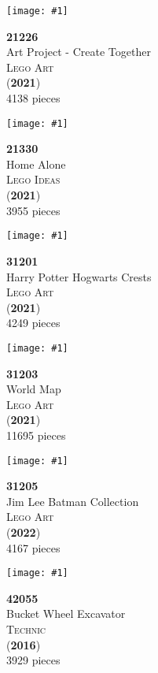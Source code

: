 \documentclass[letterpaper]{article}%
\newenvironment{legocell}[1]
{
	\begin{minipage}[c][2.0in][c]{4in}
	\centering
	\varwidth{3.6in}
	\raggedright %
	\begin{minipage}[c]{1.3in}
		\texttt{[image: \#1]}
	\end{minipage}
	\begin{minipage}[c]{2.2in}
	\raggedright
}
{
	\end{minipage}
	\endvarwidth
	\end{minipage}
	\allowbreak
	\ignorespaces
}
\begin{document}
\begin{legocell}{images/set_21226-1.jpg}
\textbf{21226}\\
{\sffamily\large Art Project - Create Together}\\
\textsc{\color{DarkBlue}\normalsize Lego Art}\\
(\textbf{2021})\\
{\normalsize 4138 pieces}\\
\end{legocell}
\begin{legocell}{images/set_21330-1.jpg}
\textbf{21330}\\
{\sffamily\large Home Alone}\\
\textsc{\color{DarkBlue}\normalsize Lego Ideas}\\
(\textbf{2021})\\
{\normalsize 3955 pieces}\\
\end{legocell}
\begin{legocell}{images/set_31201-1.jpg}
\textbf{31201}\\
{\sffamily\large Harry Potter Hogwarts Crests}\\
\textsc{\color{DarkBlue}\normalsize Lego Art}\\
(\textbf{2021})\\
{\normalsize 4249 pieces}\\
\end{legocell}
\begin{legocell}{images/set_31203-1.jpg}
\textbf{31203}\\
{\sffamily\large World Map}\\
\textsc{\color{DarkBlue}\normalsize Lego Art}\\
(\textbf{2021})\\
{\normalsize 11695 pieces}\\
\end{legocell}
\begin{legocell}{images/set_31205-1.jpg}
\textbf{31205}\\
{\sffamily\large Jim Lee Batman Collection}\\
\textsc{\color{DarkBlue}\normalsize Lego Art}\\
(\textbf{2022})\\
{\normalsize 4167 pieces}\\
\end{legocell}
\begin{legocell}{images/set_42055-1.jpg}
\textbf{42055}\\
{\sffamily\large Bucket Wheel Excavator}\\
\textsc{\color{DarkBlue}\normalsize Technic}\\
(\textbf{2016})\\
{\normalsize 3929 pieces}\\
\end{legocell}
\end{document}
